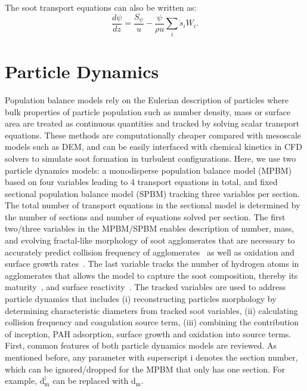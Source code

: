 The soot transport equations can also be written as:
\begin{equation}
	\frac{d \psi}{d z}=
	\frac{S_{\psi}}{u}
	-\frac{\psi}{\rho u}\sum_i \dot{s}_i W_i
	\label{eqn:sootpfr}.
\end{equation}


\section{Particle Dynamics}
Population balance models rely on the Eulerian description of particles where bulk properties of particle population such as number density, mass or surface area are treated as continuous quantities and tracked by solving scalar transport equations. These methods are computationally cheaper compared with mesoscale models such as DEM, and can be easily interfaced with chemical kinetics in CFD solvers to simulate soot formation in turbulent configurations. Here, we use two particle dynamics models: a monodisperse population balance model (MPBM) based on four variables leading to 4 transport equations in total, and fixed sectional population balance model (SPBM) tracking three variables per section. The total number of transport equations in the sectional model is determined by the number of sections and number of equations solved per section. The first two/three variables in the MPBM/SPBM enables description of number, mass, and evolving fractal-like morphology of soot agglomerates that are necessary to accurately predict collision frequency of agglomerates~\citep{mulholland1988cluster} as well as oxidation and surface growth rates~\citep{kelesidis2019estimating}. The last variable tracks the number of hydrogen atoms in agglomerates that allows the model to capture the soot composition, thereby its maturity~\citep{kholghy2016core}, and surface reactivity~\citep{blanquart2009analyzing}.  
The tracked variables are used to address particle dynamics that includes (i) reconstructing particles morphology by determining characteristic diameters from tracked soot variables, (ii) calculating collision frequency and coagulation source term, (iii) combining the contribution of inception, PAH adsorption, surface growth and oxidation into source terms.
First, common features of both particle dynamics models are reviewed. As mentioned before, any parameter with superscript i denotes the section number, which can be ignored/dropped for the MPBM that only has one section. For example, $\mathrm{d^i_m}$ can be replaced with $\mathrm{d_m}$.

